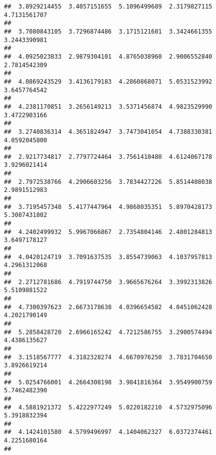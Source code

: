 \documentclass[]{article}
\begin{document}
\begin{verbatim}
##  3.8929214455  3.4057151655  5.1096499689  2.3179827115  4.7131561707 
##                                                                       
##  3.7080843105  3.7296874486  3.1715121601  3.3424661355  3.2443390981 
##                                                                       
##  4.0925023833  2.9879304101  4.8765038960  2.9006552840  2.7814542309 
##                                                                       
##  4.0869243529  3.4136179183  4.2860868071  5.0531523992  3.6457764542 
##                                                                       
##  4.2381170851  3.2656149213  3.5371456874  4.9823529990  3.4722903166 
##                                                                       
##  3.2740836314  4.3651824947  3.7473041054  4.7388330381  4.0592045800 
##                                                                       
##  2.9217734817  2.7797724464  3.7561410480  4.6124067178  3.9296021414 
##                                                                       
##  2.7972538766  4.2906603256  3.7834427226  5.8514408038  2.9891512983 
##                                                                       
##  3.7195457348  5.4177447964  4.9868035351  5.8970428173  5.3087431802 
##                                                                       
##  4.2402499932  5.9967066867  2.7354804146  2.4801284813  3.6497178127 
##                                                                       
##  4.0420124719  3.7091637535  3.8554739063  4.1037957813  4.2961312068 
##                                                                       
##  2.2712781686  4.7919744750  3.9665676264  3.3992313826  5.5109881522 
##                                                                       
##  4.7300397623  2.6673178638  4.0396654582  4.0451062428  4.2021790149 
##                                                                       
##  5.2858428720  2.6966165242  4.7212586755  3.2900574494  4.4386135627 
##                                                                       
##  3.1518567777  4.3182328274  4.6670976250  3.7831704650  3.8926619214 
##                                                                       
##  5.0254766001  4.2664308198  3.9841816364  3.9549900759  5.7462482390 
##                                                                       
##  4.5881921372  5.4222977249  5.0220182210  4.5732975096  5.3918832394 
##                                                                       
##  4.1424101580  4.5799496997  4.1404062327  6.0372374461  4.2251680164 
##                                                                       

\end{verbatim}
\end{document}
